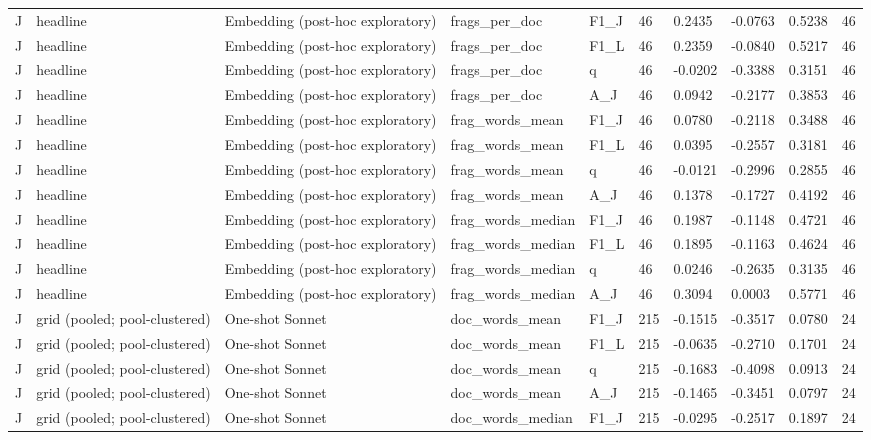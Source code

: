 \begin{table}[t]
{\begin{tabular}{llllllllll}
J & headline & Embedding (post-hoc exploratory) & frags\_per\_doc & F1\_J & 46 & 0.2435 & -0.0763 & 0.5238 & 46 \\
J & headline & Embedding (post-hoc exploratory) & frags\_per\_doc & F1\_L & 46 & 0.2359 & -0.0840 & 0.5217 & 46 \\
J & headline & Embedding (post-hoc exploratory) & frags\_per\_doc & q & 46 & -0.0202 & -0.3388 & 0.3151 & 46 \\
J & headline & Embedding (post-hoc exploratory) & frags\_per\_doc & A\_J & 46 & 0.0942 & -0.2177 & 0.3853 & 46 \\
J & headline & Embedding (post-hoc exploratory) & frag\_words\_mean & F1\_J & 46 & 0.0780 & -0.2118 & 0.3488 & 46 \\
J & headline & Embedding (post-hoc exploratory) & frag\_words\_mean & F1\_L & 46 & 0.0395 & -0.2557 & 0.3181 & 46 \\
J & headline & Embedding (post-hoc exploratory) & frag\_words\_mean & q & 46 & -0.0121 & -0.2996 & 0.2855 & 46 \\
J & headline & Embedding (post-hoc exploratory) & frag\_words\_mean & A\_J & 46 & 0.1378 & -0.1727 & 0.4192 & 46 \\
J & headline & Embedding (post-hoc exploratory) & frag\_words\_median & F1\_J & 46 & 0.1987 & -0.1148 & 0.4721 & 46 \\
J & headline & Embedding (post-hoc exploratory) & frag\_words\_median & F1\_L & 46 & 0.1895 & -0.1163 & 0.4624 & 46 \\
J & headline & Embedding (post-hoc exploratory) & frag\_words\_median & q & 46 & 0.0246 & -0.2635 & 0.3135 & 46 \\
J & headline & Embedding (post-hoc exploratory) & frag\_words\_median & A\_J & 46 & 0.3094 & 0.0003 & 0.5771 & 46 \\
J & grid (pooled; pool-clustered) & One-shot Sonnet & doc\_words\_mean & F1\_J & 215 & -0.1515 & -0.3517 & 0.0780 & 24 \\
J & grid (pooled; pool-clustered) & One-shot Sonnet & doc\_words\_mean & F1\_L & 215 & -0.0635 & -0.2710 & 0.1701 & 24 \\
J & grid (pooled; pool-clustered) & One-shot Sonnet & doc\_words\_mean & q & 215 & -0.1683 & -0.4098 & 0.0913 & 24 \\
J & grid (pooled; pool-clustered) & One-shot Sonnet & doc\_words\_mean & A\_J & 215 & -0.1465 & -0.3451 & 0.0797 & 24 \\
J & grid (pooled; pool-clustered) & One-shot Sonnet & doc\_words\_median & F1\_J & 215 & -0.0295 & -0.2517 & 0.1897 & 24 \\

\end{tabular}}
\end{table}
